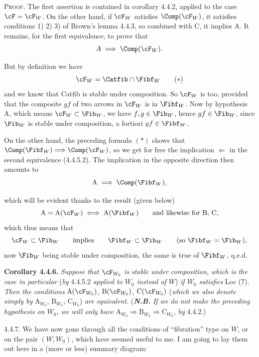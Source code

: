 
\textsc{Proof}. The first assertion is contained in corollary 4.4.2, applied to the case $\cF = \cF_W$. On the other hand, if $\cF_W$ satisfies $\Comp(\cF_W)$, it satisfies conditions 1) 2) 3) of Brown's lemma 4.4.3, so combined with C, it implies A. It remains, for the first equivalence, to prove that
\[
A \;\Longrightarrow\; \Comp(\cF_W).
\]


But by definition we have
\[
\cF_W = \Catfib \cap \Fibf_W
\tag*{$(*)$}
\]
and we know that Catfib is stable under composition. So $\cF_W$ is too, provided that the composite $gf$ of two arrows in $\cF_W$ is in $\Fibf_W$. Now by hypothesis A, which means $\cF_W \subset \Fib_W$, we have $f, g \in \Fib_W$, hence $gf \in \Fib_W$, since $\Fib_W$ is stable under composition, a fortiori $gf \in \Fibf_W$.

On the other hand, the preceding formula $(*)$ shows that $\Comp(\Fibf_W) \Longrightarrow \Comp(\cF_W)$, so we get for free the implication $\Longleftarrow$ in the second equivalence (4.4.5.2). The implication in the opposite direction then amounts to
\[
\mathrm{A} \;\Longrightarrow\; \Comp(\Fibf_W),
\]


which will be evident thanks to the result (given below)
\[
\mathrm{A} = \mathrm{A}(\cF_W) \iff \mathrm{A}(\Fibf_W) \qquad \text{and likewise for B, C,}
\]
which thus means that
\[
\cF_W \subset \Fib_W \qquad \text{implies} \qquad \Fibf_W \subset \Fib_W \qquad (\text{so } \Fibf_W = \Fib_W),
\]
now $\Fib_W$ being stable under composition, the same is true of $\Fibf_W$, q.e.d.

\textbf{Corollary 4.4.6.} \textit{Suppose that $\cF_{W_0}$ is stable under composition, which is the case in particular} (\textit{by} 4.4.5.2 \textit{applied to $W_0$ instead of $W$}) \textit{if $W_0$ satisfies} Loc (7). \textit{Then the conditions} $\mathrm{A}(\cF_{W_0})$, $\mathrm{B}(\cF_{W_0})$, $\mathrm{C}(\cF_{W_0})$ (\textit{which we also denote simply by} $\mathrm{A}_{W_0}$, $\mathrm{B}_{W_0}$, $\mathrm{C}_{W_0}$) \textit{are equivalent.} (\textbf{\textit{N.B.}} \textit{If we do not make the preceding hypothesis on $W_0$, we will only have} $\mathrm{A}_{W_0} \Longrightarrow \mathrm{B}_{W_0} \Longrightarrow \mathrm{C}_{W_0}$, \textit{by} 4.4.2.)

4.4.7. We have now gone through all the conditions of ``fibration'' type on $W$, or on the pair $(W, W_0)$, which have seemed useful to me. I am going to lay them out here in a (more or less) summary diagram: %

